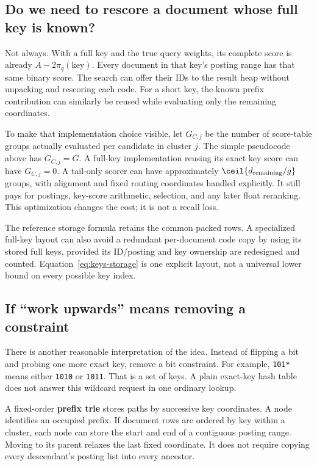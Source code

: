 \subsection{Do we need to rescore a document whose full key is known?}
Not always. With a full key and the true query weights, its complete score is already
$A-2\pi_q(\text{key})$. Every document in that key's posting range has that same binary score.
The search can offer their IDs to the result heap without unpacking and rescoring each code.
For a short key, the known prefix contribution can similarly be reused while evaluating
only the remaining coordinates.

To make that implementation choice visible, let $G_{C,j}$ be the number of score-table groups
actually evaluated per candidate in cluster $j$. The simple pseudocode above has $G_{C,j}=G$.
A full-key implementation reusing its exact key score can have $G_{C,j}=0$. A tail-only scorer
can have approximately $\ceil{d_{\rm remaining}/g}$ groups, with alignment and fixed routing
coordinates handled explicitly. It still pays for postings, key-score arithmetic, selection,
and any later float reranking. This optimization changes the cost; it is not a recall loss.

The reference storage formula retains the common packed rows. A specialized full-key layout
can also avoid a redundant per-document code copy by using its stored full keys, provided its
ID/posting and key ownership are redesigned and counted. Equation~\eqref{eq:keys-storage} is
one explicit layout, not a universal lower bound on every possible key index.

\subsection{If ``work upwards'' means removing a constraint}
There is another reasonable interpretation of the idea. Instead of flipping a bit and probing
one more exact key, remove a bit constraint. For example, \texttt{101*} means either
\texttt{1010} or \texttt{1011}. That is a set of keys. A plain exact-key hash table does not
answer this wildcard request in one ordinary lookup.

A fixed-order \textbf{prefix trie} stores paths by successive key coordinates. A node identifies
an occupied prefix. If document rows are ordered by key within a cluster, each node can store
the start and end of a contiguous posting range. Moving to its parent relaxes the last fixed
coordinate. It does not require copying every descendant's posting list into every ancestor.

